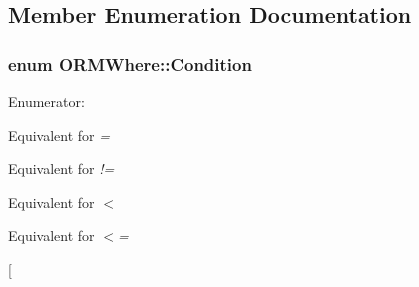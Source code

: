 \subsection{Member Enumeration Documentation}
\hypertarget{class_o_r_m_where_a187706d50dd5a95bdbffc6e41f617275}{
\subsubsection[{Condition}]{\setlength{\rightskip}{0pt plus 5cm}enum {\bf O\-R\-M\-Where\-::\-Condition}}}\label{class_o_r_m_where_a187706d50dd5a95bdbffc6e41f617275}
\begin{Desc}
\item[Enumerator\-: ]\par
\begin{description}
\item[{\em 
\hypertarget{class_o_r_m_where_a187706d50dd5a95bdbffc6e41f617275ae39fef7ec26a030eb0346ce6ab33e504}{Equals}\label{class_o_r_m_where_a187706d50dd5a95bdbffc6e41f617275ae39fef7ec26a030eb0346ce6ab33e504}
}]Equivalent for {\itshape =} \item[{\em 
\hypertarget{class_o_r_m_where_a187706d50dd5a95bdbffc6e41f617275a99524b7bbffa3a9ad1705478fe500e10}{Not\-Equals}\label{class_o_r_m_where_a187706d50dd5a95bdbffc6e41f617275a99524b7bbffa3a9ad1705478fe500e10}
}]Equivalent for {\itshape !=} \item[{\em 
\hypertarget{class_o_r_m_where_a187706d50dd5a95bdbffc6e41f617275a96b3a54ad253eb733f38c1944afeb497}{Less\-Than}\label{class_o_r_m_where_a187706d50dd5a95bdbffc6e41f617275a96b3a54ad253eb733f38c1944afeb497}
}]Equivalent for {\itshape $<$} \item[{\em 
\hypertarget{class_o_r_m_where_a187706d50dd5a95bdbffc6e41f617275a0da83e257da652ff0b20dfb44ff479cc}{Less\-Or\-Equals}\label{class_o_r_m_where_a187706d50dd5a95bdbffc6e41f617275a0da83e257da652ff0b20dfb44ff479cc}
}]Equivalent for {\itshape $<$=} \item[{\em 
}
\end{description}
\end{Desc}
